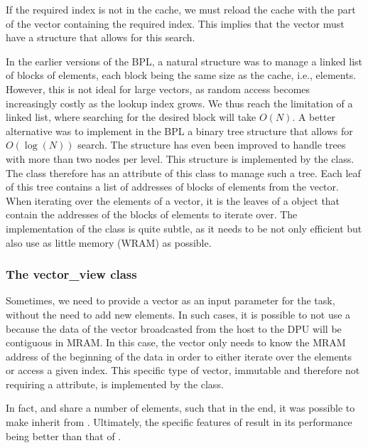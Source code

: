 If the required index is not in the cache, we must reload the cache with the part of the vector containing the required index. This implies that the vector must have a structure that allows for this search.

In the earlier versions of the BPL, a natural structure was to manage a linked list of blocks of elements, each block being the same size as the cache, 
i.e.,  elements. However, this is not ideal for large vectors, as random access becomes increasingly costly as the lookup index grows.
We thus reach the limitation of a linked list, where searching for the desired block will take $O(N)$. A better alternative was to implement in the BPL a binary tree structure that allows for $O(\log(N))$ search. The structure has even been improved to handle trees with more than two nodes per level. This structure is implemented by the  class. The  class therefore has an attribute of this class to manage such a tree. Each leaf of this tree contains a list of addresses of blocks of elements from the vector. 
When iterating over the elements of a vector, it is the leaves of a  object that contain the addresses of the blocks of elements to iterate over. The implementation of the  class is quite subtle, as it needs to be not only efficient but also use as little memory (WRAM) as possible.

\subsubsection{The vector\_view class}

Sometimes, we need to provide a vector as an input parameter for the task, without the need to add new elements. In such cases, it is possible to not use a  because the data of the vector broadcasted from the host to the DPU will be contiguous in MRAM. In this case, the vector only needs to know the MRAM address of the beginning of the data in order to either iterate over the elements or access a given index. This specific type of vector, immutable and therefore not requiring a  attribute, is implemented by the  class.

In fact,  and  share a number of elements, such that in the end, it was possible to make  inherit from . Ultimately, the specific features of  result in its performance being better than that of .

